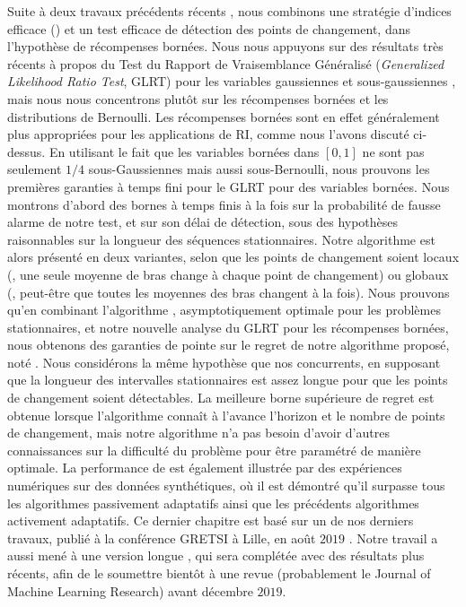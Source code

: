 \begin{resume_fr}
Suite à deux travaux précédents récents \cite{LiuLeeShroff17,CaoZhenKvetonXie18}, nous combinons une stratégie d'indices efficace (\klUCB) et un test efficace de détection des points de changement, dans l'hypothèse de récompenses bornées.
Nous nous appuyons sur des résultats très récents à propos du Test du Rapport de Vraisemblance Généralisé (\emph{Generalized Likelihood Ratio Test}, GLRT) pour les variables gaussiennes et sous-gaussiennes \cite{Maillard2018GLR}, mais nous nous concentrons plutôt sur les récompenses bornées et les distributions de Bernoulli.
Les récompenses bornées sont en effet généralement plus appropriées pour les applications de RI, comme nous l'avons discuté ci-dessus.
En utilisant le fait que les variables bornées dans $[0,1]$ ne sont pas seulement $1/4$ sous-Gaussiennes mais aussi sous-Bernoulli, nous prouvons les premières garanties à temps fini pour le GLRT pour des variables bornées.
Nous montrons d'abord des bornes à temps finis à la fois sur la probabilité de fausse alarme de notre test, et sur son délai de détection, sous des hypothèses raisonnables sur la longueur des séquences stationnaires.
Notre algorithme est alors présenté en deux variantes, selon que les points de changement soient locaux (\ie, une seule moyenne de bras change à chaque point de changement) ou globaux (\ie, peut-être que toutes les moyennes des bras changent à la fois).
%
Nous prouvons qu'en combinant l'algorithme \klUCB, asymptotiquement optimale pour les problèmes stationnaires, et notre nouvelle analyse du GLRT pour les récompenses bornées, nous obtenons des garanties de pointe sur le regret de notre algorithme proposé, noté \GLRklUCB.
Nous considérons la même hypothèse que nos concurrents, en supposant que la longueur des intervalles stationnaires est \guillemotleft{} assez longue \guillemotright{} pour que les points de changement soient détectables.
La meilleure borne supérieure de regret est obtenue lorsque l'algorithme connaît à l'avance l'horizon et le nombre de points de changement, mais notre algorithme n'a pas besoin d'avoir d'autres connaissances sur la difficulté du problème pour être paramétré de manière optimale.
%
La performance de \GLRklUCB{} est également illustrée par des expériences numériques sur des données synthétiques, où il est démontré qu'il surpasse tous les algorithmes passivement adaptatifs ainsi que les précédents algorithmes activement adaptatifs.
%
Ce dernier chapitre est basé sur un de nos derniers travaux, publié à la conférence GRETSI à Lille, en août $2019$ \cite{Besson2019Gretsi}.
Notre travail a aussi mené à une version longue \cite{Besson2019GLRT}, qui sera complétée avec des résultats plus récents, afin de le soumettre bientôt à une revue (probablement le Journal of Machine Learning Research) avant décembre $2019$.



\end{resume_fr}

